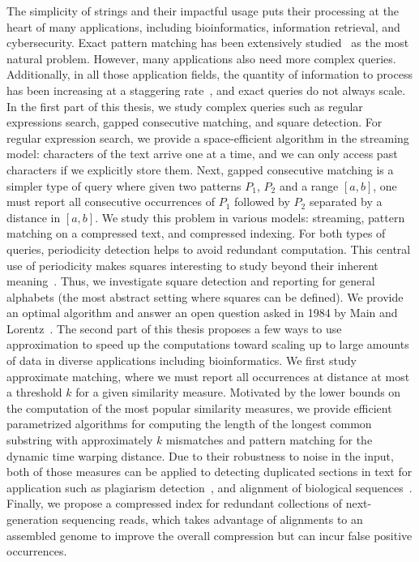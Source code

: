 The simplicity of strings and their impactful usage puts their processing at the heart of many applications, including bioinformatics, information retrieval, and cybersecurity. Exact pattern matching has been extensively studied~\cite{charras2004handbook} as the most natural problem. However, many applications also need more complex queries. Additionally, in all those application fields, the quantity of information to process has been increasing at a staggering rate~\cite{muir2016real}, and exact queries do not always scale.
%
In the first part of this thesis, we study complex queries such as regular expressions search, gapped consecutive matching, and square detection. 
For regular expression search, we provide a space-efficient algorithm in the streaming model: characters of the text arrive one at a time, and we can only access past characters if we explicitly store them. 
Next, gapped consecutive matching is a simpler type of query where given two patterns $P_1$, $P_2$ and a range $[a,b]$, one must report all consecutive occurrences of $P_1$ followed by $P_2$ separated by a distance in $[a,b]$. We study this problem in various models: streaming, pattern matching on a compressed text, and compressed indexing.
For both types of queries, periodicity detection helps to avoid redundant computation. This central use of periodicity makes squares interesting to study beyond their inherent meaning~\cite{Kolpakov2003}. Thus, we investigate square detection and reporting for general alphabets (the most abstract setting where squares can be defined). We provide an optimal algorithm and answer an open question asked in 1984 by Main and Lorentz~\cite{Main1984}.
%
The second part of this thesis proposes a few ways to use approximation to speed up the computations toward scaling up to large amounts of data in diverse applications including bioinformatics.
We first study approximate matching, where we must report all occurrences at distance at most a threshold $k$ for a given similarity measure. Motivated by the lower bounds on the computation of the most popular similarity measures, we provide efficient parametrized algorithms for computing the length of the longest common substring with approximately $k$ mismatches and pattern matching for the dynamic time warping distance.
Due to their robustness to noise in the input, both of those measures can be applied to detecting duplicated sections in text for application such as plagiarism detection~\cite{zou2010cluster}, and alignment of biological sequences~\cite{leimeister2014kmacs,loose2016real,han2018accurate}.
Finally, we propose a compressed index for redundant collections of next-generation sequencing reads, which takes advantage of alignments to an assembled genome to improve the overall compression but can incur false positive occurrences.


